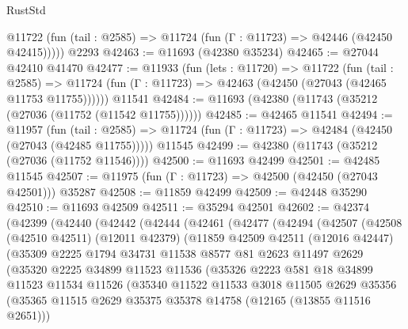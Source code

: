 \begin{lexlean}{RustStd}
\begin{coremodule}
      @11722 (fun (tail : @2585) => @11724 (fun (Γ : @11723) => @42446 (@42450 @42415)))))
    @2293
@42463 := @11693 (@42380 @35234)
@42465 := @27044 @42410 @41470
@42477 := @11933
    (fun (lets : @11720) =>
    @11722
      (fun (tail : @2585) =>
      @11724 (fun (Γ : @11723) => @42463 (@42450 (@27043 (@42465 @11753 @11755))))))
    @11541
@42484 := @11693 (@42380 (@11743 (@35212 (@27036 (@11752 (@11542 @11755))))))
@42485 := @42465 @11541
@42494 := @11957
    (fun (tail : @2585) => @11724 (fun (Γ : @11723) => @42484 (@42450 (@27043 (@42485 @11755)))))
    @11545
@42499 := @42380 (@11743 (@35212 (@27036 (@11752 @11546))))
@42500 := @11693 @42499
@42501 := @42485 @11545
@42507 := @11975 (fun (Γ : @11723) => @42500 (@42450 (@27043 @42501))) @35287
@42508 := @11859 @42499
@42509 := @42448 @35290
@42510 := @11693 @42509
@42511 := @35294 @42501
@42602 := @42374
    (@42399
      (@42440
        (@42442
          (@42444
            (@42461
              (@42477
                (@42494
                  (@42507
                    (@42508
                      (@42510 @42511)
                      (@12011 @42379)
                      (@11859
                        @42509
                        @42511
                        (@12016 @42447)
                        (@35309
                          @2225
                          @1794
                          @34731
                          @11538
                          @8577
                          @81
                          @2623
                          @11497
                          @2629
                          (@35320
                            @2225
                            @34899
                            @11523
                            @11536
                            (@35326
                              @2223
                              @581
                              @18
                              @34899
                              @11523
                              @11534
                              @11526
                              (@35340
                                @11522
                                @11533
                                @3018
                                @11505
                                @2629
                                @35356
                                (@35365
                                  @11515
                                  @2629
                                  @35375
                                  @35378
                                  @14758
                                  (@12165 (@13855 @11516 @2651)))

\end{coremodule}
\end{lexlean}
